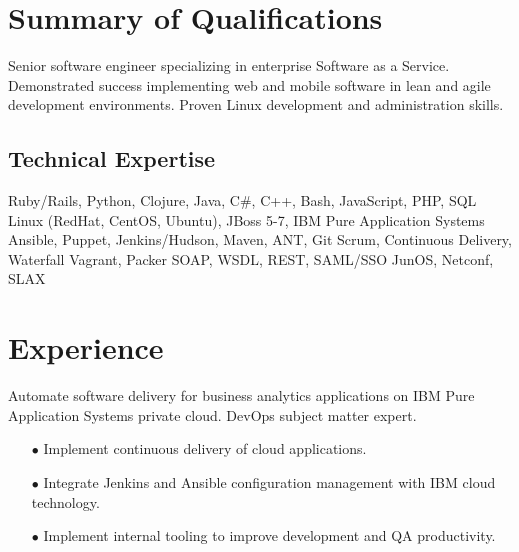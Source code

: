 \documentclass[12pt,letter,roman]{moderncv}
\begin{document}
\makecvtitle

\section{Summary of Qualifications}

Senior software engineer specializing in enterprise Software as a
Service. Demonstrated success implementing web and mobile software in
lean and agile development environments. Proven Linux development and
administration skills.

\subsection{Technical Expertise}

 { Ruby/Rails, Python, Clojure, Java, C\#, C++, Bash, JavaScript, PHP, SQL }
 { Linux (RedHat, CentOS, Ubuntu), JBoss 5-7,
IBM Pure Application Systems}
 { Ansible, Puppet, Jenkins/Hudson, Maven, ANT, Git }
 { Scrum, Continuous Delivery, Waterfall }
 { Vagrant, Packer }
 { SOAP, WSDL, REST, SAML/SSO }
 { JunOS, Netconf, SLAX }

\section{Experience}


Automate software delivery for business analytics applications on
IBM Pure Application Systems private cloud. DevOps subject matter
expert.

\begin{itemize}
  \item[$\bullet$] Implement continuous delivery of cloud applications.

  \item[$\bullet$] Integrate Jenkins and Ansible configuration
    management with IBM cloud technology.

  \item[$\bullet$] Implement internal tooling to improve development
    and QA productivity.
\end{itemize}

\end{document}
